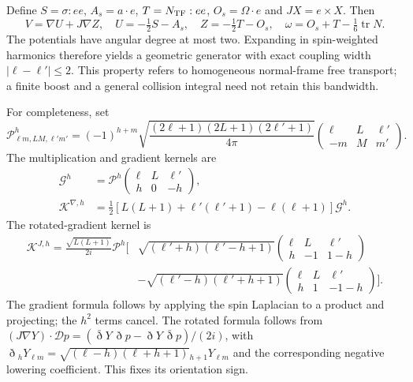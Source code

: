 Define $S=\sigma:ee$, $A_s=a\cdot e$, $T=N_{\rm TF}:ee$, $O_s=\Omega\cdot e$ and $JX=e\times X$. Then
\begin{equation}
 V=\nabla U+J\nabla Z,\quad U=-\tfrac12S-A_s,\quad
 Z=-\tfrac12T-O_s,\quad \omega=O_s+T-\tfrac16\operatorname{tr}N.
 \label{ii:hodge_potentials}
\end{equation}
The potentials have angular degree at most two. Expanding in spin-weighted harmonics therefore yields a geometric generator with exact coupling width $|\ell-\ell'|\le2$. This property refers to homogeneous normal-frame free transport; a finite boost and a general collision integral need not retain this bandwidth.

For completeness, set
\begin{equation}
 \mathcal P^h_{\ell m,LM,\ell'm'}=(-1)^{h+m}
 \sqrt{\frac{(2\ell+1)(2L+1)(2\ell'+1)}{4\pi}}
 \begin{pmatrix}\ell&L&\ell'\\-m&M&m'\end{pmatrix}.
 \label{ii:gaunt_prefactor}
\end{equation}
The multiplication and gradient kernels are
\begin{align}
 \mathcal G^h&=\mathcal P^h
       \begin{pmatrix}\ell&L&\ell'\\h&0&-h\end{pmatrix},\nonumber\\
 \mathcal K^{\nabla,h}&=\tfrac12[L(L+1)+\ell'(\ell'+1)-\ell(\ell+1)]\mathcal G^h.
 \label{ii:gaunt_gradient}
\end{align}
The rotated-gradient kernel is
\begin{align}
 \mathcal K^{J,h}=\frac{\sqrt{L(L+1)}}{2i}\mathcal P^h
 \bigg[&\sqrt{(\ell'+h)(\ell'-h+1)}
 \begin{pmatrix}\ell&L&\ell'\\h&-1&1-h\end{pmatrix}\nonumber\\
 &-\sqrt{(\ell'-h)(\ell'+h+1)}
 \begin{pmatrix}\ell&L&\ell'\\h&1&-1-h\end{pmatrix}\bigg].
 \label{ii:gaunt_rotation}
\end{align}
The gradient formula follows by applying the spin Laplacian to a product and projecting; the $h^2$ terms cancel. The rotated formula follows from
$(J\nabla Y)\cdot\mathscr Dp=(\bar\eth Y\,\eth p-\eth Y\,\bar\eth p)/(2i)$,
with $\eth{}_hY_{\ell m}=\sqrt{(\ell-h)(\ell+h+1)}{}_{h+1}Y_{\ell m}$ and the corresponding negative lowering coefficient. This fixes its orientation sign.

